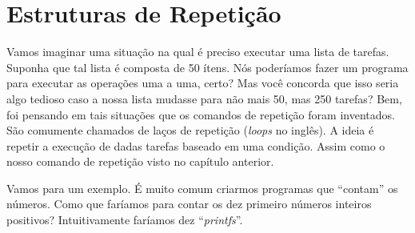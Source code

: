 \chapter{Estruturas de Repetição}
Vamos imaginar uma situação na qual é preciso executar uma lista de tarefas. Suponha que tal lista é composta de 50 ítens. Nós poderíamos fazer um programa para executar as operações uma a uma, certo? Mas você concorda que isso seria algo tedioso caso a nossa lista mudasse para não mais 50, mas 250 tarefas? Bem, foi pensando em tais situações que os comandos de repetição foram inventados. São comumente chamados de laços de repetição (\textit{loops} no inglês). A ideia é repetir a execução de dadas tarefas baseado em uma condição. Assim como o nosso comando de repetição visto no capítulo anterior.

Vamos para um exemplo. É muito comum criarmos programas que ``contam'' os números. Como que faríamos para contar os dez primeiro números inteiros positivos? Intuitivamente faríamos dez ``\textit{printfs}''. 